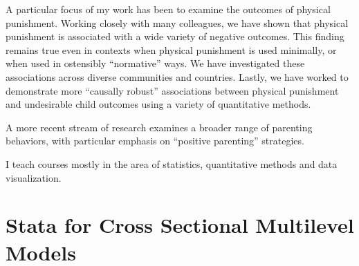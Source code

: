 \documentclass[
  letterpaper,
  DIV=11,
  numbers=noendperiod]{scrreprt}
\begin{document}
A particular focus of my work has been to examine the outcomes of
physical punishment. Working closely with many colleagues, we have shown
that physical punishment is associated with a wide variety of negative
outcomes. This finding remains true even in contexts when physical
punishment is used minimally, or when used in ostensibly ``normative''
ways. We have investigated these associations across diverse communities
and countries. Lastly, we have worked to demonstrate more ``causally
robust'' associations between physical punishment and undesirable child
outcomes using a variety of quantitative methods.

A more recent stream of research examines a broader range of parenting
behaviors, with particular emphasis on ``positive parenting''
strategies.

I teach courses mostly in the area of statistics, quantitative methods
and data visualization.

\cleardoublepage
{}
{}
\appendix

\chapter{Stata for Cross Sectional Multilevel
Models}\label{stata-for-cross-sectional-multilevel-models}
\end{document}

